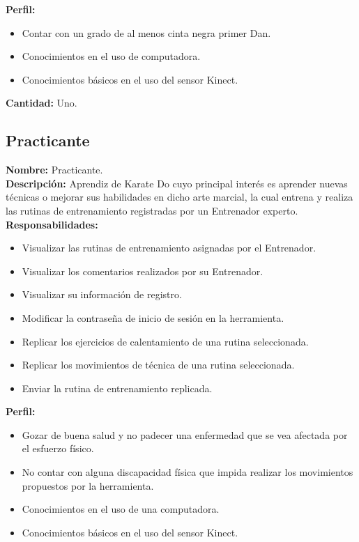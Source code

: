 \textbf{\textcolor[rgb]{0, 0, 0.545098}{Perfil:}}
\begin{itemize}
	\item Contar con un grado de al menos cinta negra primer Dan.
	\item Conocimientos en el uso de computadora.
	\item Conocimientos básicos en el uso del sensor Kinect.
\end{itemize}
\vspace{1em}

\textbf{\textcolor[rgb]{0, 0, 0.545098}{Cantidad:}} Uno.
\subsection{Practicante}
\label{act:Practicante}
\textbf{\textcolor[rgb]{0, 0, 0.545098}{Nombre:}} Practicante. \\

\textbf{\textcolor[rgb]{0, 0, 0.545098}{Descripción:}} Aprendiz de Karate Do cuyo principal interés es aprender nuevas técnicas o mejorar sus habilidades en dicho arte marcial, la cual entrena y realiza las rutinas de entrenamiento registradas por un Entrenador experto. \\

\textbf{\textcolor[rgb]{0, 0, 0.545098}{Responsabilidades:}}
\begin{itemize}
	\item Visualizar las rutinas de entrenamiento asignadas por el Entrenador.
	\item Visualizar los comentarios realizados por su Entrenador.
	\item Visualizar su información de registro.
	\item Modificar la contraseña de inicio de sesión en la herramienta.
	\item Replicar los ejercicios de calentamiento de una rutina seleccionada.
	\item Replicar los movimientos de técnica de una rutina seleccionada.
	\item Enviar la rutina de entrenamiento replicada.
\end{itemize}
\vspace{1em}

\clearpage

\textbf{\textcolor[rgb]{0, 0, 0.545098}{Perfil:}}
\begin{itemize}
	\item Gozar de buena salud y no padecer una enfermedad que se vea afectada por el esfuerzo físico.
	\item No contar con alguna discapacidad física que impida realizar los movimientos propuestos por la herramienta. 
	\item Conocimientos en el uso de una computadora.
	\item Conocimientos básicos en el uso del sensor Kinect.
\end{itemize}
\vspace{1em}

